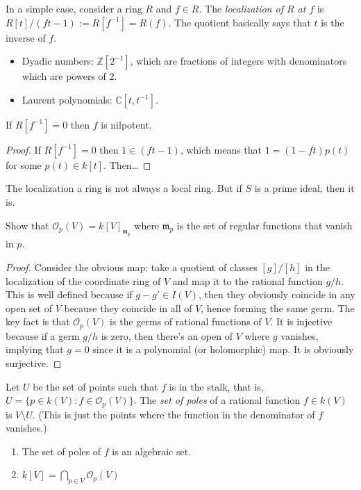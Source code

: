 \noindent
In a simple case, consider a ring $R$ and $f \in R$.
The {\it localization of $R$ at $f$}
is $R[t]/(ft-1):=R[f^{-1}]=R(f)$. 
The quotient basically says that $t$ is the inverse of $f$.

\begin{example}
\label{example-localization}
\begin{itemize}
\item Dyadic numbers: $\mathbb{Z}[2^{-1}]$,
which are fractions of integers with denominators which
are powers of $2$.

\item Laurent polynomials: $\mathbb{C}[t,t^{-1}]$.
\end{itemize}
\end{example}

\begin{lemma}
\label{lemma-localization-nilpotent}
If $R[f^{-1}]=0$ then $f$ is nilpotent.
\end{lemma}

\begin{proof}
If $R[f^{-1}]=0$ then $1 \in (ft-1)$,
which means that $1=(1-ft)p(t)$ for some $p(t) \in k[t]$.
Then…
\end{proof}

\noindent
The localization a ring is not always a local ring.
But if $S$ is a prime ideal, then it is.

\begin{exercise}
\label{exercise-localization}
Show that $\mathcal{O}_p(V) = k[V]_{\mathfrak{m}_p}$ 
where $\mathfrak{m}_p$ is the set of regular functions
that vanish in $p$.
\end{exercise}

\begin{proof}
Consider the obvious map: take a quotient of classes
$[g]/[h]$ in the localization of the coordinate ring of $V$ 
and map it to the rational function $g/h$.
This is well defined because if $g-g' \in I(V)$,
then they obviously coincide in any open set of $V$ 
because they coincide in all of $V$, hence forming the same germ.
The key fact is that $\mathcal{O}_p(V)$ is the germs of rational
functions of $V$.
It is injective because if a germ $g/h$ is zero, then there's
an open of $V$ where $g$ vanishes, implying that $g=0$
since it is a polynomial (or holomorphic) map.
It is obviously surjective.
\end{proof}

\begin{proposition}
\label{proposition-poles}
Let $U$ be the set of points such that $f$ is in the stalk, that is,
$U=\{p \in k(V):f \in \mathcal{O}_p(V)\}$.
The {\it set of poles} of a rational function
$f \in k(V)$ is $V\setminus U$.
(This is just the points where the function in the denominator
of $f$ vanishes.)

\begin{enumerate}
\item The set of poles of $f$ is an algebraic set.
\item $k[V]=\bigcap_{p\in V}\mathcal{O}_p(V)$ 
\end{enumerate}\end{proposition}

